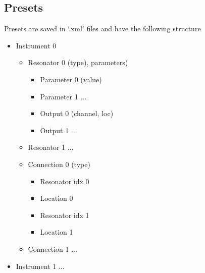 \documentclass{article}
\begin{document}
\subsection{Presets}\label{sec:presets}
Presets are saved in `.xml' files and have the following structure
\begin{itemize}
    \item Instrument 0
    \begin{itemize}
        \item Resonator 0 (type), parameters)
        \begin{itemize}
            \item Parameter 0 (value)
            \item Parameter 1 ...
            \item Output 0  (channel, loc)
            \item Output 1 ...
        \end{itemize}
        \item Resonator 1 ...
        \item Connection 0 (type)
        \begin{itemize}
            \item Resonator idx 0
            \item Location 0
            \item Resonator idx 1
            \item Location 1
        \end{itemize}
        \item Connection 1 ...
    \end{itemize}
    \item Instrument 1 ...
\end{itemize}
\end{document}
